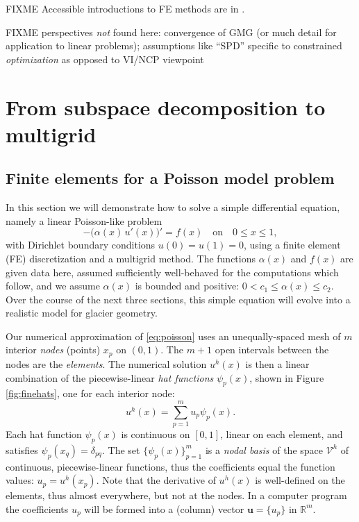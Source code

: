 \documentclass[letterpaper,final,12pt,reqno]{amsart}
\theoremstyle{claim}
\newcommand{\RR}{\mathbb{R}}
\newcommand{\bu}{\mathbf{u}}
\numberwithin{equation}{section}
\numberwithin{figure}{section}
\numberwithin{table}{section}
\begin{document}
FIXME Accessible introductions to FE methods are in \cite{Bueler2021,Elmanetal2014,Johnson2009}.

FIXME perspectives \emph{not} found here: convergence of GMG (or much detail for application to linear problems); assumptions like ``SPD'' specific to constrained \emph{optimization} as opposed to VI/NCP viewpoint


\section{From subspace decomposition to multigrid} \label{sec:subspace}

\subsection*{Finite elements for a Poisson model problem}  In this section we will demonstrate how to solve a simple differential equation, namely a linear Poisson-like problem
\begin{equation}
- \big(\alpha(x)\,u'(x)\big)' = f(x) \quad \text{on} \quad 0 \le x \le 1, \label{eq:poisson}
\end{equation}
with Dirichlet boundary conditions $u(0)=u(1)=0$, using a finite element (FE) discretization and a multigrid method.  The functions $\alpha(x)$ and $f(x)$ are given data here, assumed sufficiently well-behaved for the computations which follow, and we assume $\alpha(x)$ is bounded and positive: $0 < c_1 \le \alpha(x) \le c_2$.  Over the course of the next three sections, this simple equation will evolve into a realistic model for glacier geometry.

Our numerical approximation of \eqref{eq:poisson} uses an unequally-spaced mesh of $m$ interior \emph{nodes} (points) $x_p$ on $(0,1)$.  The $m+1$ open intervals between the nodes are the \emph{elements}.  The numerical solution $u^h(x)$ is then a linear combination of the piecewise-linear \emph{hat functions} $\psi_p(x)$, shown in Figure \ref{fig:finehats}, one for each interior node:
\begin{equation}
u^h(x) = \sum_{p=1}^m u_p \psi_p(x). \label{eq:trialsolution}
\end{equation}
Each hat function $\psi_p(x)$ is continuous on $[0,1]$, linear on each element, and satisfies $\psi_p(x_q) = \delta_{pq}$.  The set $\{\psi_p(x)\}_{p=1}^m$ is a \emph{nodal basis} of the space $\mathcal{V}^h$ of continuous, piecewise-linear functions, thus the coefficients equal the function values: $u_p=u^h(x_p)$.  Note that the derivative of $u^h(x)$ is well-defined on the elements, thus almost everywhere, but not at the nodes.  In a computer program the coefficients $u_p$ will be formed into a (column) vector $\bu=\{u_p\}$ in $\RR^m$.
\end{document}
